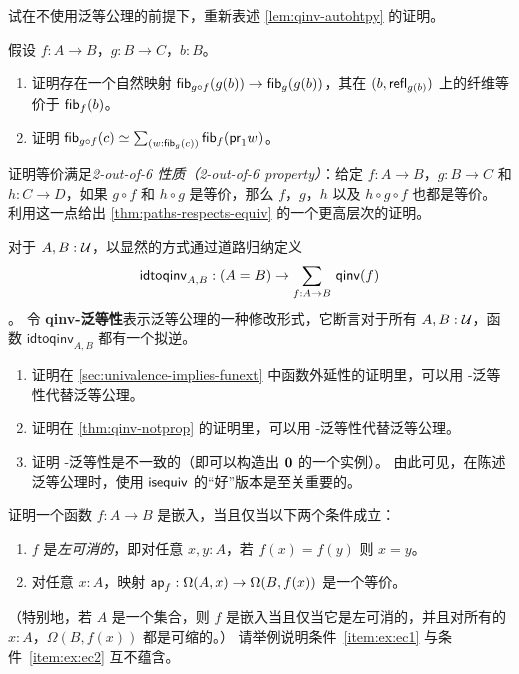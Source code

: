 \begin{ex} \label{ex:qinv-autohtpy-no-univalence}
  试在不使用泛等公理的前提下，重新表述 \cref{lem:qinv-autohtpy} 的证明。
\end{ex}

\begin{ex}[不稳定的八面体公理]\label{ex:unstable-octahedron}
  假设 $f:A\to B$，$g:B\to C$，$b:B$。
  \begin{enumerate}
  \item 证明存在一个自然映射 ${\mathsf{fib}}_{g\circ f}(g(b)) \to {\mathsf{fib}}_{g}(g(b))$，其在 $(b,\mathsf{refl}_{g(b)})$ 上的纤维等价于 ${\mathsf{fib}}_{f}(b)$。
  \item 证明 $\eqv{\hfib{g\circ f}{c}}{\sm{w:\hfib{g}{c}} \hfib f {\proj1 w}}$。
  \end{enumerate}
\end{ex}

\begin{ex}\label{ex:2-out-of-6}
  证明等价满足\emph{2-out-of-6 性质（2-out-of-6 property）}：给定 $f:A\to B$，$g:B\to C$ 和 $h:C\to D$，如果 $g\circ f$ 和 $h\circ g$ 是等价，那么 $f$，$g$，$h$ 以及 $h\circ g\circ f$ 也都是等价。
  利用这一点给出 \cref{thm:paths-respects-equiv} 的一个更高层次的证明。
\end{ex}

\begin{ex}\label{ex:qinv-univalence}
  对于 $A,B:\mathcal{U}$，以显然的方式通过道路归纳定义
  \[ \mathsf{idtoqinv}_{A,B} :(A=B) \to \sm{f:A\to B}\qinv(f) \]
  。
  令 \textbf{\textsf{qinv}-泛等性}表示泛等公理的一种修改形式，它断言对于所有 $A,B:\mathcal{U}$，函数 $\mathsf{idtoqinv}_{A,B}$ 都有一个拟逆。
  \begin{enumerate}
  \item 证明在 \cref{sec:univalence-implies-funext} 中函数外延性的证明里，可以用 \qinv-泛等性代替泛等公理。
  \item 证明在 \cref{thm:qinv-notprop} 的证明里，可以用 \qinv-泛等性代替泛等公理。
  \item 证明 \qinv-泛等性是不一致的（即可以构造出 $\mathbf{0}$ 的一个实例）。
    由此可见，在陈述泛等公理时，使用 $\mathsf{isequiv}$ 的``好''版本是至关重要的。
  \end{enumerate}
\end{ex}

\begin{ex}\label{ex:embedding-cancellable}
  证明一个函数 $f:A\to B$ 是嵌入，当且仅当以下两个条件成立：
  \begin{enumerate}
  \item $f$ 是\emph{左可消的}，即对任意 $x,y:A$，若 $f(x)=f(y)$ 则 $x=y$。\label{item:ex:ec1}
  \item 对任意 $x:A$，映射 $\mathsf{ap}_{f}: \Omega(A,x) \to \Omega(B,f(x))$ 是一个等价。\label{item:ex:ec2}
  \end{enumerate}
  （特别地，若 $A$ 是一个集合，则 $f$ 是嵌入当且仅当它是左可消的，并且对所有的 $x:A$，$\Omega(B,f(x))$ 都是可缩的。）
  请举例说明条件~\ref{item:ex:ec1} 与条件~\ref{item:ex:ec2} 互不蕴含。
\end{ex}

